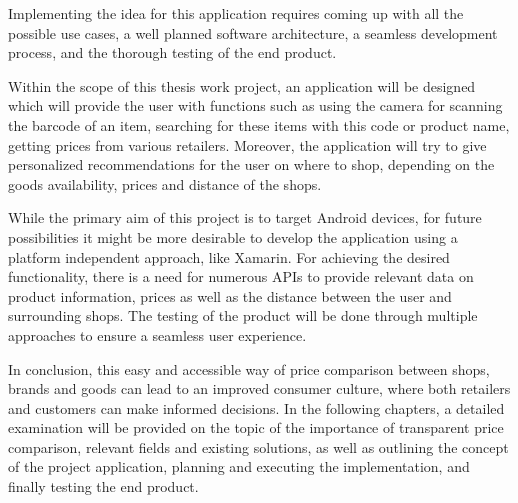 Implementing the idea for this application requires coming up with all the possible use cases, a well planned  software architecture, a seamless development process, and the thorough testing of the end product. 

\pagebreak

Within the scope of this thesis work project, an application will be designed which will provide the user with functions such as using the camera for scanning the barcode of an item, searching for these items with this code or product name, getting prices from various retailers. Moreover, the application will try to give personalized recommendations for the user on where to shop, depending on the goods availability, prices and distance of the shops.

While the primary aim of this project is to target Android devices, for future possibilities it might be more desirable to develop the application using a platform independent approach, like Xamarin. For achieving the desired functionality, there is a need for numerous APIs to provide relevant data on product information, prices as well as the distance between the user and surrounding shops. The testing of the product will be done through multiple approaches to ensure a seamless user experience.

In conclusion, this easy and accessible way of price comparison between shops, brands and goods can lead to an improved consumer culture, where both retailers and customers can make informed decisions. In the following chapters, a detailed examination will be provided on the topic of the importance of transparent price comparison, relevant fields and existing solutions, as well as outlining the concept of the project application, planning and executing the implementation, and finally testing the end product.



